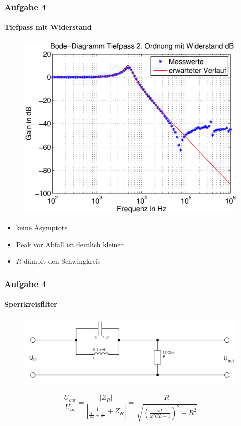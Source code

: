 \begin{frame}
    \frametitle{Aufgabe 4}
    \framesubtitle{Tiefpass mit Widerstand}
     \begin{figure}[H]
     \begin{center}
             \includegraphics[scale=0.45]{./img/4a_bode_tief_dB_W.eps}
     \end{center}
     \end{figure}
     \begin{itemize}
        \item keine Asymptote
         \item Peak vor Abfall ist deutlich kleiner
         \item $R$ dämpft den Schwingkreis
     \end{itemize}
\end{frame}
\begin{frame}
    \frametitle{Aufgabe 4}
    \framesubtitle{Sperrkreisfilter}
    \begin{figure}[H]
    \begin{center}
            \includegraphics[scale=0.2]{./img/4b_schaltung.png}
    \end{center}
    \end{figure}
    \begin{equation*}
        \frac{U_{out}}{U_{in}}
        =
        \frac{\left\vert Z_R \right\vert}{\left\vert \frac{1}{\frac{1}{Z_C}+\frac{1}{Z_L}}
        +Z_R \right\vert }
        =
        \frac{R}{\sqrt{\left(\frac{\omega L}{\omega^2 C L +1}\right)^2 +
        R^2}}
    \end{equation*}
\end{frame}
